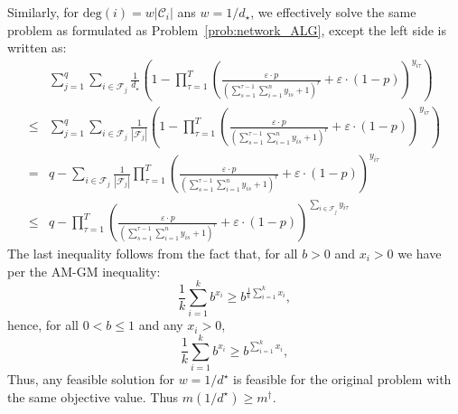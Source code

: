 \documentclass[nonblindrev]{informs3noheader}
\def\calC{\mathcal{C}}
\def\calF{\mathcal{F}}
\begin{document}
Similarly, for $\text{deg}(i)=w|\calC_i|$ ans $w=1/d_\star$, we effectively solve the same problem as formulated as Problem~\eqref{prob:network_ALG}, except the left side is written as:
\begin{align*}
    &\sum_{j=1}^q \sum_{i \in \calF_j} \frac{1}{d_\star}\left(1-\prod_{\tau=1}^T \left(\frac{\varepsilon\cdot p }{\left(\sum_{s=1}^{\tau-1} \sum_{i=1}^n y_{is} +1\right)^r}+\varepsilon\cdot(1-p)\right)^{y_{i\tau}}\right)
    \\\leq &\sum_{j=1}^q \sum_{i \in \calF_j} \frac{1}{|\calF_j|}\left(1-\prod_{\tau=1}^T \left(\frac{\varepsilon\cdot p }{\left(\sum_{s=1}^{\tau-1} \sum_{i=1}^n y_{is} +1\right)^r}+\varepsilon\cdot(1-p)\right)^{y_{i\tau}}\right)
     \\ =&q-\sum_{i \in \calF_j} \frac{1}{|\calF_j|}\prod_{\tau=1}^T \left(\frac{\varepsilon\cdot p }{\left(\sum_{s=1}^{\tau-1} \sum_{i=1}^n y_{is} +1\right)^r}+\varepsilon\cdot(1-p)\right)^{y_{i\tau}}
      \\ \leq &q-\prod_{\tau=1}^T \left(\frac{\varepsilon\cdot p }{\left(\sum_{s=1}^{\tau-1} \sum_{i=1}^n y_{is} +1\right)^r}+\varepsilon\cdot(1-p)\right)^{\sum_{i \in \calF_j} y_{i\tau}}    
\end{align*}
The last inequality follows from the fact that, for all $b>0$ and $x_i>0$ we have per the AM-GM inequality:
\[\frac{1}{k} \sum_{i=1}^k b^{x_i} \geq b^{\frac{1}{k}\sum_{i=1}^k x_i},\]
hence, for all $0<b\leq 1$ and any $x_i>0$,
\[\frac{1}{k} \sum_{i=1}^k b^{x_i} \geq b^{\sum_{i=1}^k x_i},\]
Thus, any feasible solution for $w=1/d^\star$ is feasible for the original problem with the same objective value. Thus $m(1/d^\star)\geq m^\dagger$.
\end{document}
